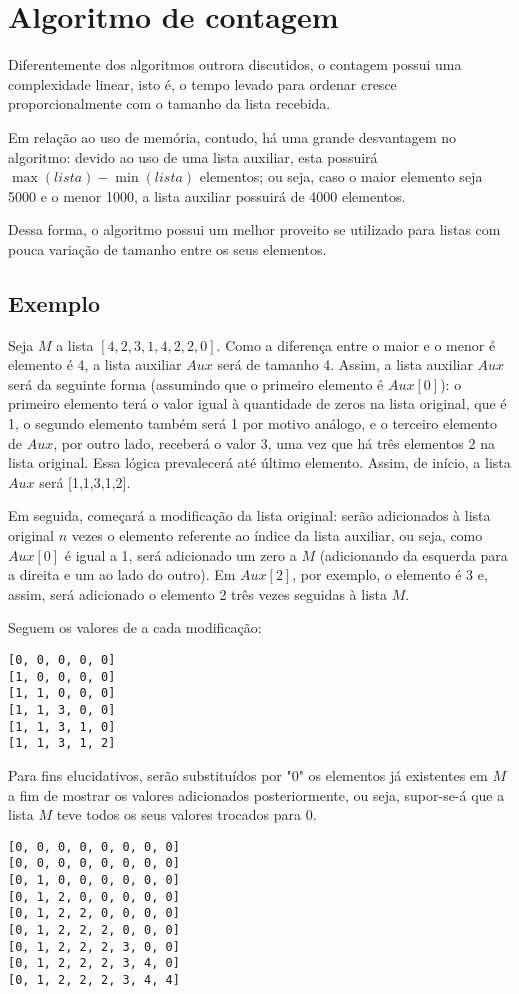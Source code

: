 \section{Algoritmo de contagem}
Diferentemente dos algoritmos outrora discutidos, o contagem possui uma complexidade linear, isto é, o tempo levado para ordenar cresce proporcionalmente com o tamanho da lista recebida. 

Em relação ao uso de memória, contudo, há uma grande desvantagem no algoritmo: devido ao uso de uma lista auxiliar, esta possuirá $\max({lista})-\min({lista}) $ elementos; ou seja, caso o maior elemento seja 5000 e o menor 1000, a lista auxiliar possuirá de 4000 elementos.

Dessa forma, o algoritmo possui um melhor proveito se utilizado para listas com pouca variação de tamanho entre os seus elementos.

\subsection{Exemplo}
Seja $M$ a lista $[4,2,3,1,4,2,2,0]$. Como a diferença entre o maior e o menor é elemento é 4, a lista auxiliar $Aux$ será de tamanho 4.
Assim, a lista auxiliar $Aux$ será da seguinte forma (assumindo que o primeiro elemento é $Aux[0]$): o primeiro elemento terá o valor igual à quantidade de zeros na lista original, que é 1, o segundo elemento também será 1 por motivo análogo, e o terceiro elemento de $Aux$, por outro lado, receberá o valor 3, uma vez que há três elementos 2 na lista original. Essa lógica prevalecerá até último elemento.
Assim, de início, a lista $Aux$ será [1,1,3,1,2].

Em seguida, começará a modificação da lista original: serão adicionados à lista original $n$ vezes o elemento referente ao índice da lista auxiliar, ou seja, como $Aux[0]$ é igual a 1, será adicionado um zero a $M$ (adicionando da esquerda para a direita e um ao lado do outro). Em $Aux[2]$, por exemplo, o elemento é 3 e, assim, será adicionado o elemento 2 três vezes seguidas à lista $M$.

Seguem os valores de  a cada modificação:
\begin{lstlisting}
[0, 0, 0, 0, 0]
[1, 0, 0, 0, 0]
[1, 1, 0, 0, 0]
[1, 1, 3, 0, 0]
[1, 1, 3, 1, 0]
[1, 1, 3, 1, 2]
\end{lstlisting}
\newpage
Para fins elucidativos, serão substituídos por "0" os elementos já existentes em $M$ a fim de mostrar os valores adicionados posteriormente, ou seja, supor-se-á que a lista $M$ teve todos os seus valores trocados para 0.
\begin{lstlisting}
[0, 0, 0, 0, 0, 0, 0, 0]
[0, 0, 0, 0, 0, 0, 0, 0]
[0, 1, 0, 0, 0, 0, 0, 0]
[0, 1, 2, 0, 0, 0, 0, 0]
[0, 1, 2, 2, 0, 0, 0, 0]
[0, 1, 2, 2, 2, 0, 0, 0]
[0, 1, 2, 2, 2, 3, 0, 0]
[0, 1, 2, 2, 2, 3, 4, 0]
[0, 1, 2, 2, 2, 3, 4, 4] 
\end{lstlisting}

